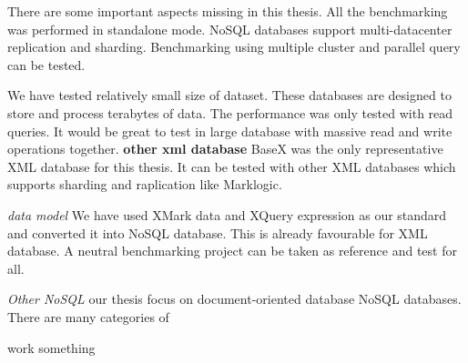 There are some important aspects missing in this thesis. All the benchmarking was performed in standalone mode. NoSQL databases support multi-datacenter replication and sharding. Benchmarking using multiple cluster and parallel query can be tested. 

We have tested relatively small size of dataset. These databases are designed to store and process terabytes of data. The performance was only tested with read queries. It would be great to test in large database with massive read and write operations together. 
\textbf{other xml database }
BaseX was the only representative XML database for this thesis. It can be tested with other XML databases which supports sharding and  raplication like Marklogic. 

\textit{data model} 
We have used XMark data and XQuery expression as our standard and converted it into NoSQL database. This is already favourable for XML database. A neutral benchmarking project can be taken as reference and test for all. 

\textit{Other NoSQL} 
our thesis focus on document-oriented database NoSQL databases. There are many categories of

work something 
